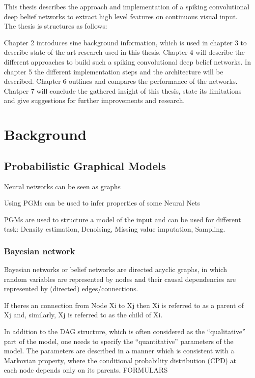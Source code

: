 This thesis describes the approach and implementation of a spiking convolutional deep belief networks to extract high level features on continuous visual input. The thesis is structures as follows:

Chapter 2 introduces sine background information, which is used in chapter 3 to describe state-of-the-art research used in this thesis. Chapter 4 will describe the different approaches to build such a spiking convolutional deep belief networks. In chapter 5 the different implementation steps and the architecture will be described. Chapter 6 outlines and compares the performance of the networks. Chatper 7 will conclude the gathered insight of this thesis, state its limitations and give suggestions for further improvements and research.  

\chapter{Background}

\section{Probabilistic Graphical Models}

Neural networks can be seen as graphs

Using PGMs can be used to infer properties of some Neural Nets

PGMs are used to structure a model of the input and can be used for different task:
Density estimation,
Denoising,
Missing value imputation,
Sampling.


\subsection{Bayesian network}

Bayesian networks or belief networks are directed acyclic graphs, in which random variables are represented by nodes and their causal dependencies are represented by (directed) edges/connections. 

If theres an connection from Node Xi to Xj then Xi is referred to as a parent of Xj and, similarly, Xj is referred to as the child of Xi.

In addition to the DAG structure, which is often considered as the “qualitative” part of the model, one needs to specify the “quantitative” parameters of the model. 
The parameters are described in a manner which is consistent with a Markovian property, where the conditional probability distribution (CPD) at each node depends only on its parents. 
FORMULARS

